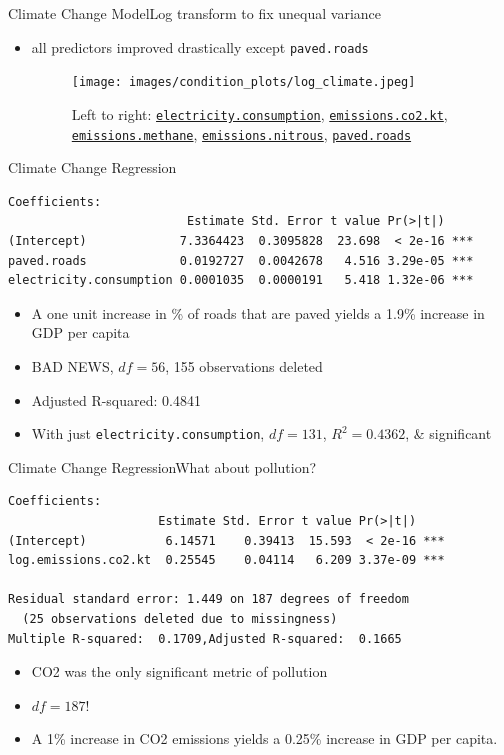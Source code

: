 \documentclass{beamer}
\begin{document}
\begin{frame}{{\sc Climate Change} Model}{Log transform to fix unequal variance}
  \begin{itemize}
  \item all predictors improved drastically except {\tt paved.roads}
    \begin{figure}
      \centering
      \texttt{[image: images/condition\_plots/log\_climate.jpeg]}
      \caption{Left to right: \href{http://data.worldbank.org/indicator/EG.USE.ELEC.KH.PC}{\tt electricity.consumption}, \href{http://data.worldbank.org/indicator/EN.ATM.CO2E.KT}{\tt emissions.co2.kt}, \href{http://data.worldbank.org/indicator/EN.ATM.METH.KT.CE}{\tt emissions.methane}, \href{http://data.worldbank.org/indicator/EN.ATM.NOXE.KT.CE}{\tt emissions.nitrous}, \href{http://data.worldbank.org/indicator/IS.ROD.PAVE.ZS}{\tt paved.roads}}
    \end{figure}
  \end{itemize}
\end{frame}

\begin{frame}[fragile]{{\sc Climate Change} Regression}
\small
\begin{verbatim}
Coefficients:
                         Estimate Std. Error t value Pr(>|t|)    
(Intercept)             7.3364423  0.3095828  23.698  < 2e-16 ***
paved.roads             0.0192727  0.0042678   4.516 3.29e-05 ***
electricity.consumption 0.0001035  0.0000191   5.418 1.32e-06 ***
\end{verbatim}
\begin{itemize}
\item A one unit increase in \% of roads that are paved yields a 1.9\% increase in GDP per capita
\item BAD NEWS, $df = 56$, 155 observations deleted
\item Adjusted R-squared:  0.4841
\item With just {\tt electricity.consumption}, $df = 131$, $R^2 = 0.4362$, \& significant
\end{itemize}
\end{frame}

\begin{frame}[fragile]{{\sc Climate Change} Regression}{What about pollution?}
\small
\begin{verbatim}
Coefficients:
                     Estimate Std. Error t value Pr(>|t|)    
(Intercept)           6.14571    0.39413  15.593  < 2e-16 ***
log.emissions.co2.kt  0.25545    0.04114   6.209 3.37e-09 ***

Residual standard error: 1.449 on 187 degrees of freedom
  (25 observations deleted due to missingness)
Multiple R-squared:  0.1709,Adjusted R-squared:  0.1665 
\end{verbatim}
\begin{itemize}
\item CO2 was the only significant metric of pollution
\item $df = 187$!
\item A 1\% increase in CO2 emissions yields a 0.25\% increase in GDP per capita.
\end{itemize}
\end{frame}
\end{document}
